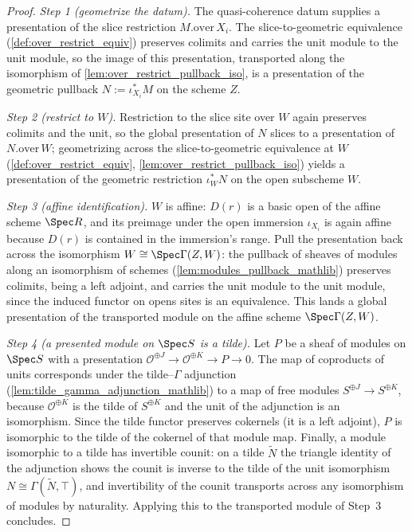 \begin{proof}
  \leanok
  \emph{Step 1 (geometrize the datum).} The quasi-coherence datum supplies a presentation
  of the slice restriction \(M.\mathrm{over}\,X_i\). The slice-to-geometric equivalence
  (\cref{def:over_restrict_equiv}) preserves colimits and carries the unit module to the
  unit module, so the image of this presentation, transported along the isomorphism of
  \cref{lem:over_restrict_pullback_iso}, is a presentation of the geometric pullback
  \(N := \iota_{X_i}^{*} M\) on the scheme \(Z\).

  \emph{Step 2 (restrict to \(W\)).} Restriction to the slice site over \(W\) again
  preserves colimits and the unit, so the global presentation of \(N\) slices to a
  presentation of \(N.\mathrm{over}\,W\); geometrizing across the slice-to-geometric
  equivalence at \(W\) (\cref{def:over_restrict_equiv},
  \cref{lem:over_restrict_pullback_iso}) yields a presentation of the geometric
  restriction \(\iota_W^{*} N\) on the open subscheme \(W\).

  \emph{Step 3 (affine identification).} \(W\) is affine: \(D(r)\) is a basic open of the
  affine scheme \(\Spec R\), and its preimage under the open immersion \(\iota_{X_i}\) is
  again affine because \(D(r)\) is contained in the immersion's range. Pull the
  presentation back across the isomorphism \(W \cong \Spec\Gamma(Z, W)\): the pullback of
  sheaves of modules along an isomorphism of schemes
  (\cref{lem:modules_pullback_mathlib}) preserves colimits, being a left adjoint, and
  carries the unit module to the unit module, since the induced functor on opens sites is
  an equivalence. This lands a global presentation of the transported module on the
  affine scheme \(\Spec\Gamma(Z, W)\).

  \emph{Step 4 (a presented module on \(\Spec S\) is a tilde).} Let \(P\) be a sheaf of
  modules on \(\Spec S\) with a presentation
  \(\mathcal{O}^{\oplus J} \to \mathcal{O}^{\oplus K} \to P \to 0\). The map of coproducts
  of units corresponds under the tilde--\(\Gamma\) adjunction
  (\cref{lem:tilde_gamma_adjunction_mathlib}) to a map of free modules
  \(S^{\oplus J} \to S^{\oplus K}\), because \(\mathcal{O}^{\oplus K}\) is the tilde of
  \(S^{\oplus K}\) and the unit of the adjunction is an isomorphism. Since the tilde
  functor preserves cokernels (it is a left adjoint), \(P\) is isomorphic to the tilde of
  the cokernel of that module map. Finally, a module isomorphic to a tilde has invertible
  counit: on a tilde \(\widetilde{N}\) the triangle identity of the adjunction shows the
  counit is inverse to the tilde of the unit isomorphism \(N \cong
  \Gamma(\widetilde{N}, \top)\), and invertibility of the counit transports across any
  isomorphism of modules by naturality. Applying this to the transported module of
  Step~3 concludes.
\end{proof}

